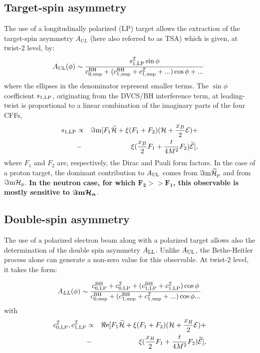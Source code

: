 \subsection{Target-spin asymmetry}\label{sec_tsa}
The use of a longitudinally polarized (LP) target allows the extraction of the target-spin asymmetry $A_{UL}$ (here also referred to as TSA) which is given, at twist-2 level, by:
\begin{equation}\label{eq_tsa}
A_{\rm UL}(\phi) \sim \frac{s_{1,{\rm LP}}^{\cal I}\sin\phi}{c_{0,{\rm unp}}^{\rm BH}+(c_{1,{\rm unp}}^{\rm BH}+c_{1,{\rm unp}}^{\cal I}+...)\cos\phi+...}\ 
\end{equation}
where the ellipses in the denominator represent smaller terms. The $\sin\phi$ coefficient $s_{1,{\rm LP}}$, originating from the DVCS/BH interference term, at leading-twist is proportional to a linear combination of the imaginary parts of the four CFFs, 
\begin{eqnarray}
s_{1,{\rm LP}} &\propto&  \Im{\rm m}[ F_1\widetilde{\cal H}+\xi(F_1+F_2)({\cal H}+\frac{x_B}{2}{\cal E})+\nonumber \\
&-& \xi(\frac{x_B}{2} F_1+ \frac{t}{4M^2}F_2)\widetilde{\cal E}] ,
\end{eqnarray}
\noindent
where $F_1$ and $F_2$ are, respectively, the Dirac and Pauli form factors. In the case of a proton target, the dominant contribution to $A_{\rm UL}$ comes from $\Im{\rm m} \widetilde{\cal {H}}_p$ and from $\Im{\rm m}{\cal {H}}_p$. {\bf In the neutron case, for which $\boldsymbol{F_2 >> F_1}$, this observable is mostly sensitive to $\boldsymbol{\Im{\rm m}{\cal {H}}_n}$}. 

\subsection{Double-spin asymmetry}\label{sec_dsa}

The use of a polarized electron beam along with a polarized target allows also the determination of the double spin asymmetry $A_{\rm LL}$. Unlike $A_{\rm UL}$, the Bethe-Heitler process alone can generate a non-zero value for this observable. At twist-2 level, it takes the form: 

\begin{equation}
A_{LL}(\phi) \sim \frac{c_{0,{\rm LP}}^{\rm BH}+c_{0,{\rm LP}}^{\cal I}
	 +(c_{1,{\rm LP}}^{\rm BH}+c_{1,{\rm LP}}^{\cal I})\cos\phi}
	{c_{0,{\rm unp}}^{\rm BH}+(c_{1,{\rm unp}}^{\rm BH}+c_{1,{\rm unp}}^{\cal I}+...)\cos\phi...}
\end{equation}
with
\begin{eqnarray}\label{eq_dsa}
c_{0,{\rm LP}}^{\cal I}, c_{1,{\rm LP}}^{\cal I}
&\propto& \Re{\rm e} [F_1 \widetilde { \cal H} + \xi (F_1 +  F_2)({\cal H}+\frac{x_B}{2}{\cal E})+\nonumber\\
&-& \xi(\frac{x_B}{2} F_1+\frac{t}{4M^2}F_2)\widetilde{\cal E} ],
\end{eqnarray}
\noindent

